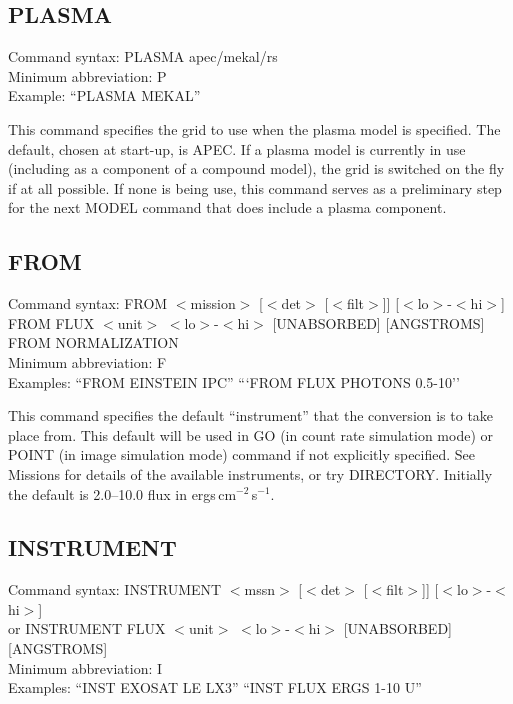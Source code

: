 \subsection*{PLASMA}

Command syntax: PLASMA apec/mekal/rs \\
Minimum abbreviation: P \\
Example: ``PLASMA MEKAL'' \\
\vspace{0.5 cm}

This command specifies the grid to use when the plasma model is specified.
The default, chosen at start-up, is APEC.  If a plasma model is currently
in use (including as a component of a compound model), the grid is switched
on the fly if at all possible.  If none is being use, this command serves
as a preliminary step for the next MODEL command that does include a plasma
component.

\subsection*{FROM}

Command syntax: FROM $<$mission$>$ [$<$det$>$ [$<$filt$>$]] [$<$lo$>$-$<$hi$>$] \\
\hspace{1.5 cm} FROM FLUX $<$unit$>$ $<$lo$>$-$<$hi$>$ [UNABSORBED] [ANGSTROMS] \\
\hspace{1.5 cm} FROM NORMALIZATION \\
Minimum abbreviation: F \\
Examples: ``FROM EINSTEIN IPC'' ```FROM FLUX PHOTONS 0.5-10'' \\
\vspace{0.5 cm}

This command specifies the default ``instrument'' that the conversion is to take
place from.   This default will be used in  GO (in count rate simulation mode)
or POINT (in image simulation mode) command if not explicitly specified.   See
Missions for details of the available instruments, or try DIRECTORY. Initially
the default is 2.0--10.0 flux in ergs\,cm$^{-2}$\,s$^{-1}$.

\subsection*{INSTRUMENT}

Command syntax: INSTRUMENT $<$mssn$>$ [$<$det$>$ [$<$filt$>$]] [$<$lo$>$-$<$hi$>$] \\
\hspace{1.5 cm} or INSTRUMENT FLUX $<$unit$>$ $<$lo$>$-$<$hi$>$ [UNABSORBED] [ANGSTROMS] \\
Minimum abbreviation: I \\
Examples: ``INST EXOSAT LE LX3'' ``INST FLUX ERGS 1-10 U'' \\
\vspace{0.5 cm}

